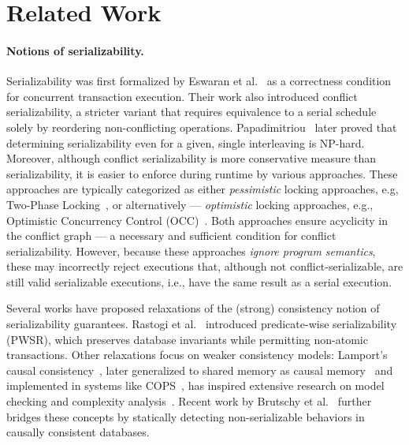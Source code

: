 \section{Related Work}
\label{sec:relatedWork}

\paragraph{Notions of serializability.}


Serializability was first formalized by Eswaran et al.~\cite{EsGrKoTr76} as a correctness condition for concurrent transaction execution. Their work also introduced conflict serializability, a stricter variant that requires equivalence to a serial schedule solely by reordering non-conflicting operations. Papadimitriou~\cite{Pa79} later proved that determining serializability even for a given, single interleaving is NP-hard. 
%
Moreover, although conflict serializability is more conservative measure than serializability, it is easier to enforce during runtime by various approaches. 
%
These approaches are typically categorized as either \textit{pessimistic} locking approaches, e.g, Two-Phase Locking~\cite{BeHaGo87}, or alternatively --- \textit{optimistic} locking approaches, e.g., Optimistic Concurrency Control (OCC)~\cite{KuRo81, BuMo06}.
%
Both approaches ensure acyclicity in the conflict graph --- a necessary and sufficient condition for conflict serializability. However, because these approaches \textit{ignore program semantics}, these may incorrectly reject executions that, although not conflict-serializable, are still valid serializable executions, i.e., have the same result as a serial execution.
%

Several works have proposed relaxations of the (strong) consistency notion of serializability guarantees. Rastogi et al.~\cite{RaMeBrKoSi93} introduced predicate-wise serializability (PWSR), which preserves database invariants while permitting non-atomic transactions. 
%
Other relaxations focus on weaker consistency models: Lamport’s causal consistency~\cite{La78}, later generalized to shared memory as causal memory~\cite{AhNeBuKoHu95} and implemented in systems like COPS~\cite{LlFrKaAn11}, has inspired extensive research on model checking and complexity analysis~\cite{BoEnGuHa17,ZeBiBoEnEr19,LaBo20}. 
%
Recent work by Brutschy et al.~\cite{BrDiMuVe18} further bridges these concepts by statically detecting non-serializable behaviors in causally consistent databases.


